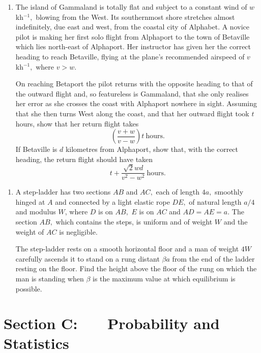 \documentclass[a4, 11pt]{report}
\newlength{\qspace}
\newcounter{qnumber}
\newenvironment{question}%
 {\vspace{\qspace}
  \begin{enumerate}[\bfseries 1\quad][10]%
    \setcounter{enumi}{\value{qnumber}}%
    \item%
 }
{
  \end{enumerate}
  \filbreak
  \stepcounter{qnumber}
 }
\begin{document}
\begin{question}	
The island of Gammaland is totally flat and subject to a constant
wind of $w$ kh$^{-1},$ blowing from the West. Its southernmost shore
stretches almost indefinitely, due east and west, from the coastal
city of Alphabet. A novice pilot is making her first solo flight from
Alphaport to the town of Betaville which lies north-east of Alphaport.
Her instructor has given her the correct heading to reach Betaville,
flying at the plane's recommended airspeed of $v$ kh$^{-1},$ where
$v>w.$ 


On reaching Betaport the pilot returns with the opposite heading to
that of the outward flight and, so featureless is Gammaland, that
she only realises her error as she crosses the coast with Alphaport
nowhere in sight. Assuming that she then turns West along the coast,
and that her outward flight took $t$ hours, show that her return
flight takes 
\[
\left(\frac{v+w}{v-w}\right)t\ \text{hours.}
\]
If Betaville is $d$ kilometres from Alphaport, show that, with the
correct heading, the return flight should have taken 
\[
t+\frac{\sqrt{2}wd}{v^{2}-w^{2}}\ \text{hours.}
\]
\end{question}


\begin{question}
A step-ladder has two sections $AB$ and $AC,$ each of length $4a,$
smoothly hinged at $A$ and connected by a light elastic rope $DE,$
of natural length $a/4$ and modulus $W$, where $D$ is on $AB,$
$E$ is on $AC$ and $AD=AE=a.$ The section $AB,$ which contains
the steps, is uniform and of weight $W$ and the weight of $AC$ is
negligible. 


The step-ladder rests on a smooth horizontal floor and a man of weight
$4W$ carefully ascends it to stand on a rung distant $\beta a$ from
the end of the ladder resting on the floor. Find the height above
the floor of the rung on which the man is standing when $\beta$ is
the maximum value at which equilibrium is possible. 
\end{question}
	

	
	\newpage
\section*{Section C: \ \ \ Probability and Statistics}
\end{document}
